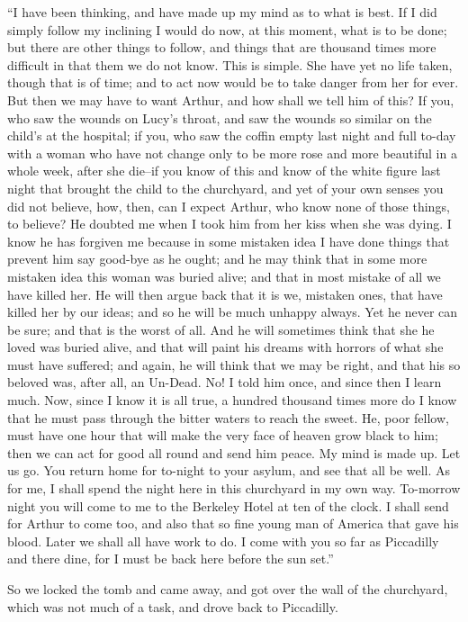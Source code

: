 \documentclass[12pt,openright]{book}
\begin{document}
“I have been thinking, and have made up my mind as to what is best. If I did simply follow my inclining I would do now, at this moment, what is to be done; but there are other things to follow, and things that are thousand times more difficult in that them we do not know. This is simple. She have yet no life taken, though that is of time; and to act now would be to take danger from her for ever. But then we may have to want Arthur, and how shall we tell him of this? If you, who saw the wounds on Lucy’s throat, and saw the wounds so similar on the child’s at the hospital; if you, who saw the coffin empty last night and full to-day with a woman who have not change only to be more rose and more beautiful in a whole week, after she die–if you know of this and know of the white figure last night that brought the child to the churchyard, and yet of your own senses you did not believe, how, then, can I expect Arthur, who know none of those things, to believe? He doubted me when I took him from her kiss when she was dying. I know he has forgiven me because in some mistaken idea I have done things that prevent him say good-bye as he ought; and he may think that in some more mistaken idea this woman was buried alive; and that in most mistake of all we have killed her. He will then argue back that it is we, mistaken ones, that have killed her by our ideas; and so he will be much unhappy always. Yet he never can be sure; and that is the worst of all. And he will sometimes think that she he loved was buried alive, and that will paint his dreams with horrors of what she must have suffered; and again, he will think that we may be right, and that his so beloved was, after all, an Un-Dead. No! I told him once, and since then I learn much. Now, since I know it is all true, a hundred thousand times more do I know that he must pass through the bitter waters to reach the sweet. He, poor fellow, must have one hour that will make the very face of heaven grow black to him; then we can act for good all round and send him peace. My mind is made up. Let us go. You return home for to-night to your asylum, and see that all be well. As for me, I shall spend the night here in this churchyard in my own way. To-morrow night you will come to me to the Berkeley Hotel at ten of the clock. I shall send for Arthur to come too, and also that so fine young man of America that gave his blood. Later we shall all have work to do. I come with you so far as Piccadilly and there dine, for I must be back here before the sun set.”

So we locked the tomb and came away, and got over the wall of the churchyard, which was not much of a task, and drove back to Piccadilly.
\end{document}

